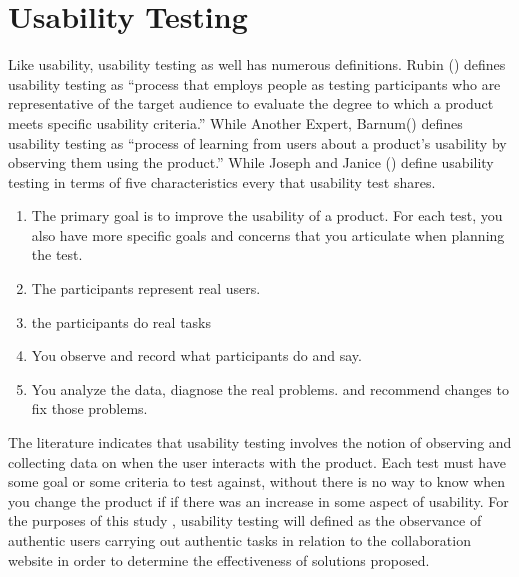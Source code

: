\documentclass[a4paper,oneside,11pt]{report}
\begin{document}
\section{Usability Testing}
Like usability, usability testing as well has numerous definitions. Rubin
(\citeyear{rubinchinsel2008}) defines usability testing as \enquote{process that employs people as testing participants who are representative of the target audience to evaluate the degree to which a product meets specific usability criteria.} While Another Expert, Barnum(\citeyear{barnum2002}) defines usability testing as \enquote{process of learning from users about a product’s usability by observing them using the product.} While  Joseph and Janice (\citeyear{jj1993}) define usability testing in terms of five characteristics every that usability test shares.
\quote 
	\begin{enumerate}
		\item The primary goal is to improve the usability of a product. For each test, you also have more specific goals and concerns that you articulate when planning the test.
  		\item The participants represent real users.
  		\item the participants do real tasks
  		\item You observe and record what participants do and say.
  		\item You analyze the data, diagnose the real problems. and recommend changes to fix those problems.
	\end{enumerate} 
\endquote
The literature indicates that usability testing involves the notion of observing and collecting data on when the user interacts with the product. Each test must have some goal or some criteria to test against, without there is no way to know when you change the product if if there was an increase in some aspect of usability.
For the purposes of this study , usability testing will defined as the observance of authentic users carrying out authentic tasks in relation to the collaboration website in order to determine the effectiveness of solutions proposed.

\printbibliography
\end{document}
